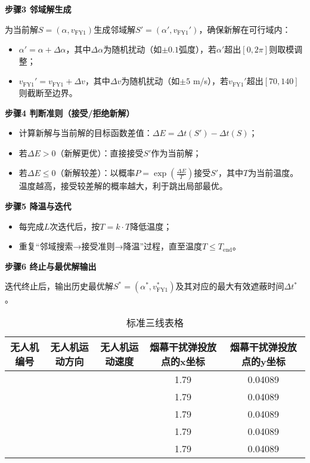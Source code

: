 \documentclass[../main.tex]{subfiles}
\begin{document}
\noindent\textbf{步骤3 邻域解生成}

为当前解$S=(\alpha, v_{\text{FY1}})$生成邻域解$S'=(\alpha', v_{\text{FY1}}')$，确保新解在可行域内：
\begin{itemize}
    \item $\alpha' = \alpha + \Delta\alpha$，其中$\Delta\alpha$为随机扰动（如$\pm0.1$弧度），若$\alpha'$超出$[0,2\pi]$则取模调整；
    \item $v_{\text{FY1}}' = v_{\text{FY1}} + \Delta v$，其中$\Delta v$为随机扰动（如$\pm5$ m/s），若$v_{\text{FY1}}'$超出$[70,140]$则截断至边界。
\end{itemize}

\noindent\textbf{步骤4 判断准则（接受/拒绝新解）}
\begin{itemize}
    \item 计算新解与当前解的目标函数差值：$\Delta E = \Delta t(S') - \Delta t(S)$；
    \item 若$\Delta E > 0$（新解更优）：直接接受$S'$作为当前解；
    \item 若$\Delta E \leq 0$（新解较差）：以概率$P = \exp\left(\frac{\Delta E}{T}\right)$接受$S'$，其中$T$为当前温度。温度越高，接受较差解的概率越大，利于跳出局部最优。
\end{itemize}

\noindent\textbf{步骤5 降温与迭代}
\begin{itemize}
    \item 每完成$L$次迭代后，按$T = k \cdot T$降低温度；
    \item 重复“邻域搜索→接受准则→降温”过程，直至温度$T \leq T_{\text{end}}$。
\end{itemize}

\noindent\textbf{步骤6 终止与最优解输出}

迭代终止后，输出历史最优解$S^*=(\alpha^*, v_{\text{FY1}}^*)$及其对应的最大有效遮蔽时间$\Delta t^*$。


\begin{table}[H]
\caption{标准三线表格}
\label{tab:001} 
\centering
\begin{small}
\begin{tabular}{ccccc}
\toprule[1.5pt]
无人机编号 &无人机运动方向 & 无人机运动速度  & 烟幕干扰弹投放点的x坐标& 烟幕干扰弹投放点的y坐标 \\
\midrule[1pt]
 &             &                      & 1.79                    & 0.04089     \\            
 &             &                       & 1.79                    & 0.04089      \\           
 &             &                     & 1.79                    & 0.04089      \\           
 &             &                     & 1.79                    & 0.04089       \\          
 &             &                    & 1.79                    & 0.04089      \\            
\bottomrule[1.5pt]
\end{tabular}
\end{small}
\end{table}
\end{document}
